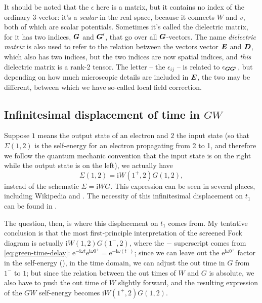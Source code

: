 \documentclass[hyperref, a4paper, 12pt]{report}
\newcommand*{\ii}{\mathrm{i}}
\newcommand*{\ee}{\mathrm{e}}
\begin{document}
It should be noted that the $\epsilon$ here is a matrix,
but it contains no index of the ordinary 3-vector:
it's a \emph{scalar} in the real space,
because it connects $W$ and $v$,
both of which are scalar potentials.
Sometimes it's called the dielectric matrix, 
for it has two indices, $\vb*{G}$ and $\vb*{G}'$,
that go over all $\vb*{G}$-vectors.
The name \emph{dielectric matrix}
is also used to refer to the relation between
the vectors vector $\vb*{E}$ and $\vb*{D}$,
which also has two indices, 
but the two indices are now spatial indices, 
and \emph{this} dielectric matrix is a rank-2 tensor.
The letter -- the $\epsilon_{ij}$ -- 
is related to $\epsilon_{\vb*{G} \vb*{G}'}$,
but depending on how much microscopic details are included in $\vb*{E}$,
the two may be different, 
between which we have so-called local field correction.

\subsection{Infinitesimal displacement of time in $GW$}\label{sec:gw-bse.overview-gw.infinitesimal}

Suppose $1$ means the output state of an electron 
and $2$ the input state
(so that $\Sigma(1, 2)$ is the self-energy for an electron propagating from 2 to 1,
and therefore we follow the quantum mechanic convention that 
the input state is on the right while the output state is on the left), 
we actually have 
\begin{equation}
    \Sigma(1, 2) = \ii W(1^+, 2) G(1, 2),
\end{equation}
instead of the schematic $\Sigma = \ii W G$.
This expression can be seen in several places,
including Wikipedia and \cite{hedin1965new,berger2020potential}.
The necessity of this infinitesimal displacement on $t_1$
can be found in .

The question, then, is where this displacement on $t_1$ comes from.
My tentative conclusion is that the most first-principle interpretation of the screened Fock diagram 
is actually $\ii W(1, 2) G(1^-, 2)$, 
where the $-$ superscript comes from \eqref{eq:green-time-delay}:
$\ee^{- \ii \omega t} \ee^{\ii \omega 0^+} = \ee^{- \ii \omega (t^-)}$;
since we can leave out the $\ee^{\ii \omega 0^+}$ factor in the self-energy 
(),
in the time domain,
we can adjust the out time in $G$ from $1^-$ to $1$;
but since the relation between the out times of $W$ and $G$ is absolute, 
we also have to push the out time of $W$ slightly forward, 
and the resulting expression of the $GW$ self-energy becomes 
$\ii W(1^+, 2) G(1, 2)$.
\end{document}
